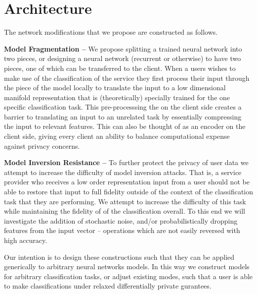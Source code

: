 \section{Architecture}

\FigFragmentSingle

The network modifications that we propose are constructed as follows.

\textbf{Model Fragmentation --}
We propose splitting a trained neural network into two pieces, or designing a neural 
network (recurrent or otherwise) to have two pieces, one of which can be transferred
to the client. When a users wishes to make use of the classification of the service they
first process their input through the piece of the model locally to translate the input
to a low dimensional manifold representation that is (theoretically) specially trained
for the one specific classification task. This pre-processsing the on the client side 
creates a barrier to translating an input to an unrelated task by essentially compressing
the input to relevant features. This can also be thought of as an encoder on the client
side, giving every client an ability to balance computational expense against privacy 
concerns.


\textbf{Model Inversion Resistance --}
To further protect the privacy of user data we attempt to increase the difficulty of
model inversion attacks. That is, a service provider who receives a low order 
representation input from a user should not be able to restore that input to full
fidelity outside of the context of the classification task that they are performing. 
We attempt to increase the difficulty of this task while maintaining the fidelity of
of the classification overall. To this end we will investigate the addition of stochastic
noise, and/or probabilistically dropping features from the input vector -- operations 
which are not easily reversed with high accuracy.

\medskip
Our intention is to design these constructions such that they can be applied generically
to arbitrary neural networks models. In this way we construct models for arbitrary
classification tasks, or adjust existing modes, such that a user is able to make 
classifications under relaxed differentially private gurantees.

